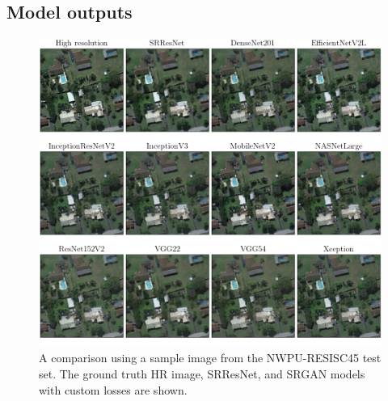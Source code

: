 \begin{appendices}
\section{Model outputs}
\begin{figure}[H]
    \centering
    \includegraphics[width=\linewidth]{./assets/model_comparison.png}
    \caption{A comparison using a sample image from the NWPU-RESISC45 test set. The ground truth HR image, SRResNet, and SRGAN models with custom losses are shown.}
    \label{fig:model_comparison}
\end{figure}


\end{appendices}
